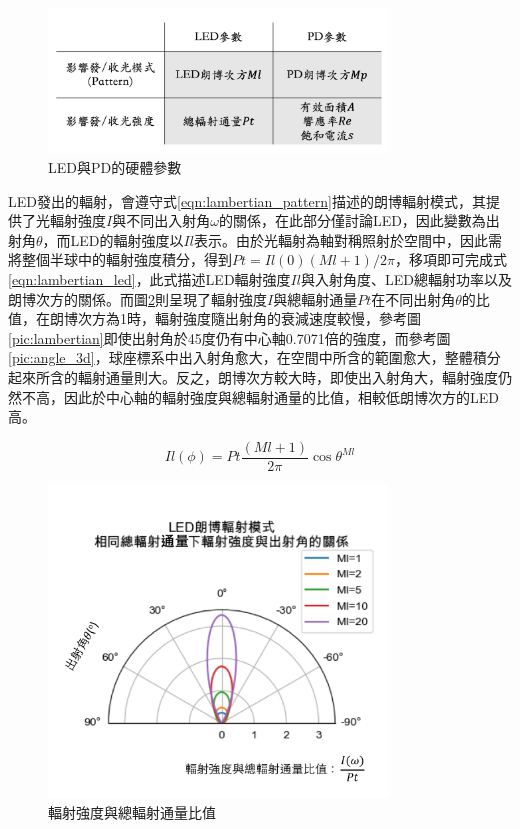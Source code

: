         \begin{figure}[ht]
            \centering
            \includegraphics[width=9cm]{ch2pic/hardware_para.png}
            \caption{LED與PD的硬體參數}
            \label{pic:hardware_para}
        \end{figure}

        LED發出的輻射，會遵守式\ref{eqn:lambertian_pattern}描述的朗博輻射模式，其提供了光輻射強度$I$與不同出入射角$\omega$的關係，在此部分僅討論LED，因此變數為出射角$\theta$，而LED的輻射強度以$Il$表示。由於光輻射為軸對稱照射於空間中，因此需將整個半球中的輻射強度積分，得到$Pt = Il(0)(Ml+1)/2\pi$，移項即可完成式\ref{eqn:lambertian_led}，此式描述LED輻射強度$Il$與入射角度、LED總輻射功率以及朗博次方的關係。而圖\ref{pic:lambertian_led}則呈現了輻射強度$I$與總輻射通量$Pt$在不同出射角$\theta$的比值，在朗博次方為1時，輻射強度隨出射角的衰減速度較慢，參考圖\ref{pic:lambertian}即使出射角於45度仍有中心軸0.7071倍的強度，而參考圖\ref{pic:angle_3d}，球座標系中出入射角愈大，在空間中所含的範圍愈大，整體積分起來所含的輻射通量則大。反之，朗博次方較大時，即使出入射角大，輻射強度仍然不高，因此於中心軸的輻射強度與總輻射通量的比值，相較低朗博次方的LED高。
        
    
        \begin{equation}
            \label{eqn:lambertian_led}
            Il(\phi)=Pt\frac{(Ml+1)}{2 \pi} \cos \theta^{Ml}
        \end{equation}

        \begin{figure}[ht]
            \centering
            \includegraphics[width=9cm]{ch2pic/lambertian_led.png}
            \caption{輻射強度與總輻射通量比值}
            \label{pic:lambertian_led}
        \end{figure}



